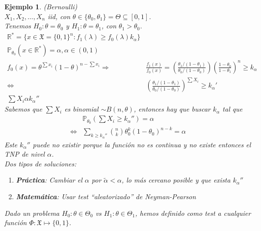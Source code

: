 \documentclass[10pt]{article}
\theoremstyle{plain}
\newtheorem{ej}{Ejemplo}
\theoremstyle{definition}
\begin{document}
\begin{ej} (Bernoulli)\\
$X_{1}, X_{2}, \ldots, X_{n}$ iid, con $\theta \in \{\theta_{0},\theta_{1}\} = \Theta \subseteq [0,1]$.\\
Tenemos $H_{0}: \theta = \theta_{0}$ y $H_{1}: \theta = \theta_{1}$, con $\theta_{1}>\theta_{0}$.
\begin{align*}
\mathbb{R}^* = \{x \in \mathfrak{X} = \{0,1\}^n\colon f_{1}(\lambda) \ge f_{0}(\lambda)k_{\alpha}\}\\
\mathbb{P}_{\theta_{0}}(x \in \mathbb{R}^*) = \alpha, \alpha \in (0,1)\\
f_{0}(x) = \theta^{\sum x_{i}}(1-\theta)^{n-\sum x_{i}} \Rightarrow & \frac{f_{1}(x)}{f_{0}(x)} = \left(\frac{\theta_{1}/(1-\theta_{1})}{\theta_{0}/(1-\theta_{0})}\right)\left(\frac{1-\theta_{0}}{1-\theta_{1}}\right)^n \ge k_{\alpha}\\
\Leftrightarrow & \left(\frac{\theta_{1}/(1-\theta_{1})}{\theta_{0}/(1-\theta_{0})}\right)^{\sum X_{i}} \ge k_{\alpha}'\\
\sum X_{i} \alpha k_{\alpha}''
\end{align*}
Sabemos que $\sum X_{i}$ es binomial $\sim B(n,\theta)$, entonces hay que buscar $k_{\alpha}$ tal que 
\begin{align*}
&\mathbb{P}_{\theta_{0}}\left(\sum X_{i} \ge k_{\alpha}''\right) = \alpha\\
\Leftrightarrow &\sum_{k\ge k_{\alpha}''} \binom{n}{k} \theta_{0}^k (1-\theta_{0})^{n-k} = \alpha
\end{align*}
Este $k_{\alpha}''$ puede no existir porque la función no es continua y no existe entonces el TNP de nivel $\alpha$.\\

Dos tipos de soluciones:
\begin{enumerate}
\item \textbf{Práctica}: Cambiar el $\alpha$ por $\tilde{\alpha}<\alpha$, lo más cercano posible y que exista $k_{\alpha}''$
\item \textbf{Matemática}: Usar test ``aleatorizado'' de Neyman-Pearson
\end{enumerate}
Dado un problema $H_{0}: \theta \in \Theta_{0}$ vs $H_{1}: \theta \in \Theta_{1}$, hemos definido como test a cualquier función $\Phi : \mathfrak{X} \mapsto \{0,1\}$.\\


\end{ej}
\end{document}
